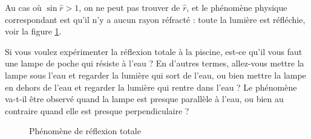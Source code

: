 Au cas où $\sin\hat r>1$, on ne peut pas trouver de $\hat r$, et le phénomène physique correspondant est qu'il n'y a aucun rayon réfracté : toute la lumière est réfléchie, voir la figure \ref{FigReflTot}.

\begin{exercice}
Si vous voulez expérimenter la réflexion totale à la piscine, est-ce qu'il vous faut une lampe de poche qui résiste à l'eau ? En d'autres termes, allez-vous mettre la lampe sous l'eau et regarder la lumière qui sort de l'eau, ou bien mettre la lampe en dehors de l'eau et regarder la lumière qui rentre dans l'eau ? Le phénomène va-t-il être observé quand la lampe est presque parallèle à l'eau, ou bien au contraire quand elle est presque perpendiculaire ?
\end{exercice}

\begin{figure}[ht]
\centering
{}						%
%
%
\caption{Phénomène de réflexion totale}\label{FigReflTot}
\end{figure}

